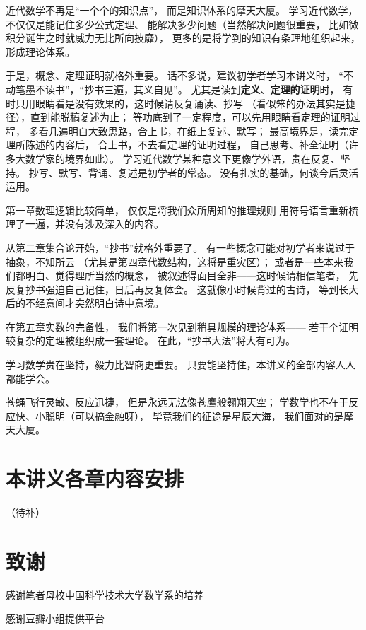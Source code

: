 近代数学不再是“一个个的知识点”，
而是知识体系的摩天大厦。
学习近代数学，不仅仅是能记住多少公式定理、
能解决多少问题（当然解决问题很重要，
比如微积分诞生之时就威力无比所向披靡），
更多的是将学到的知识有条理地组织起来，
形成理论体系。

于是，概念、定理证明就格外重要。
话不多说，建议初学者学习本讲义时，
“不动笔墨不读书”，“抄书三遍，其义自见”。
尤其是读到\textbf{定义}、\textbf{定理的证明}时，
有时只用眼睛看是没有效果的，这时候请反复诵读、抄写
（看似笨的办法其实是捷径），直到能脱稿复述为止；
等功底到了一定程度，可以先用眼睛看定理的证明过程，
多看几遍明白大致思路，合上书，在纸上复述、默写；
最高境界是，读完定理所陈述的内容后，
合上书，不去看定理的证明过程，
自己思考、补全证明（许多大数学家的境界如此）。
学习近代数学某种意义下更像学外语，贵在反复、坚持。
抄写、默写、背诵、复述是初学者的常态。
没有扎实的基础，何谈今后灵活运用。\vs

第一章数理逻辑比较简单，
仅仅是将我们众所周知的推理规则
用符号语言重新梳理了一遍，并没有涉及深入的内容。

从第二章集合论开始，“抄书”就格外重要了。
有一些概念可能对初学者来说过于抽象，不知所云
（尤其是第四章代数结构，这将是重灾区）；
或者是一些本来我们都明白、觉得理所当然的概念，
被叙述得面目全非——这时候请相信笔者，
先反复抄书强迫自己记住，日后再反复体会。
这就像小时候背过的古诗，
等到长大后的不经意间才突然明白诗中意境。

在第五章实数的完备性，
我们将第一次见到稍具规模的理论体系——
若干个证明较复杂的定理被组织成一套理论。
在此，“抄书大法”将大有可为。\vs

学习数学贵在坚持，毅力比智商更重要。
只要能坚持住，本讲义的全部内容人人都能学会。

苍蝇飞行灵敏、反应迅捷，
但是永远无法像苍鹰般翱翔天空；
学数学也不在于反应快、小聪明（可以搞金融呀），
毕竟我们的征途是星辰大海，
我们面对的是摩天大厦。

\section*{本讲义各章内容安排}

（待补）

\newpage

\section*{致谢}

感谢笔者母校中国科学技术大学数学系的培养

感谢豆瓣小组提供平台

